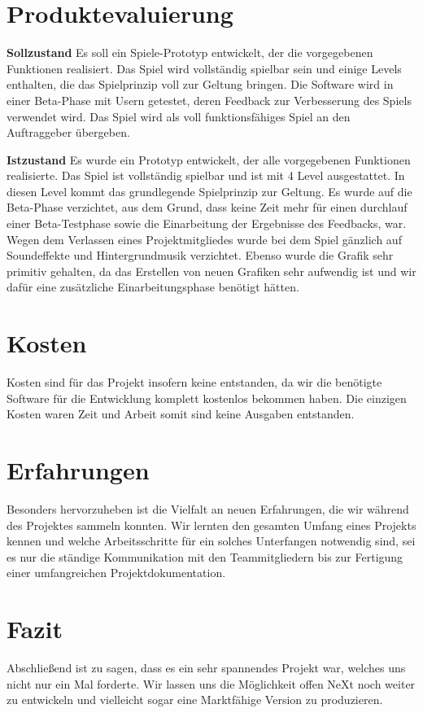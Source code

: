 \section{Produktevaluierung}
\textbf{Sollzustand}\newline
Es soll ein Spiele-Prototyp entwickelt, der die vorgegebenen Funktionen realisiert. Das Spiel wird vollständig spielbar sein und einige Levels enthalten, die das Spielprinzip voll zur Geltung bringen. Die Software wird in einer Beta-Phase mit Usern getestet, deren Feedback zur Verbesserung des Spiels verwendet wird. Das Spiel wird als voll funktionsfähiges Spiel an den Auftraggeber übergeben.

\textbf{Istzustand}\newline
Es wurde ein Prototyp entwickelt, der alle vorgegebenen Funktionen realisierte. Das Spiel ist vollständig spielbar und ist mit 4 Level ausgestattet. In diesen Level kommt das grundlegende Spielprinzip zur Geltung. Es wurde auf die Beta-Phase verzichtet, aus dem Grund, dass keine Zeit mehr für einen durchlauf einer Beta-Testphase sowie die Einarbeitung der Ergebnisse des Feedbacks, war. Wegen dem Verlassen eines Projektmitgliedes wurde bei dem Spiel gänzlich auf Soundeffekte und Hintergrundmusik verzichtet. Ebenso wurde die Grafik sehr primitiv gehalten, da das Erstellen von neuen Grafiken sehr aufwendig ist und wir dafür eine zusätzliche Einarbeitungsphase benötigt hätten.

\section{Kosten}
Kosten sind für das Projekt insofern keine entstanden, da wir die benötigte Software für die Entwicklung komplett kostenlos bekommen haben. Die einzigen Kosten waren Zeit und Arbeit somit sind keine Ausgaben entstanden.

\section{Erfahrungen}
Besonders hervorzuheben ist die Vielfalt an neuen Erfahrungen, die wir während des Projektes sammeln konnten. Wir lernten den gesamten Umfang eines Projekts kennen und welche Arbeitsschritte für ein solches Unterfangen notwendig sind, sei es nur die ständige Kommunikation mit den Teammitgliedern bis zur Fertigung einer umfangreichen Projektdokumentation. 

\section{Fazit}
Abschließend ist zu sagen, dass es ein sehr spannendes Projekt war, welches uns nicht nur ein Mal forderte. Wir lassen uns die Möglichkeit offen NeXt noch weiter zu entwickeln und vielleicht sogar eine Marktfähige Version zu produzieren.
